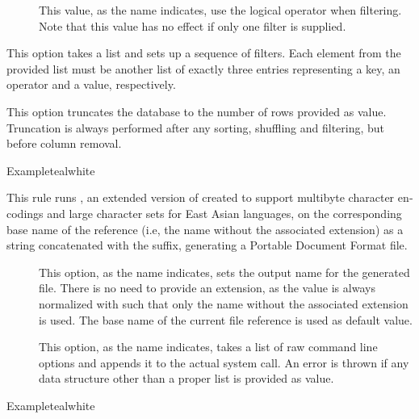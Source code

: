 \begin{description}
\begin{description}
\begin{description}
\item[] This value, as the name indicates, use the logical  operator when filtering. Note that this value has no effect if only one filter is supplied.
\end{description}

\item[\abox{filters}] This option takes a list and sets up a sequence of filters. Each element from the provided list must be another list of exactly three entries representing a key, an operator and a value, respectively.

\item[\abox{truncate}] This option truncates the database to the number of rows provided as value. Truncation is always performed after any sorting, shuffling and filtering, but before column removal.
\end{description}

\begin{codebox}{Example}{teal}{\icnote}{white}
\end{codebox}

\item[\rulebox{dvipdfmx}{Marco Daniel, Paulo Cereda}] This rule runs , an extended version of  cre­ated to sup­port multibyte char­ac­ter en­cod­ings and large char­ac­ter sets for East Asian lan­guages, on the corresponding base name of the  reference (i.e, the name without the associated extension) as a string concatenated with the  suffix, generating a Portable Document Format  file.

\begin{description}
\item[] This option, as the name indicates, sets the output name for the generated  file. There is no need to provide an extension, as the value is always normalized with  such that only the name without the associated extension is used. The base name of the current file reference is used as default value.

\item[] This option, as the name indicates, takes a list of raw command line options and appends it to the actual system call. An error is thrown if any data structure other than a proper list is provided as value.
\end{description}

\begin{codebox}{Example}{teal}{\icnote}{white}
\end{codebox}


\end{description}

